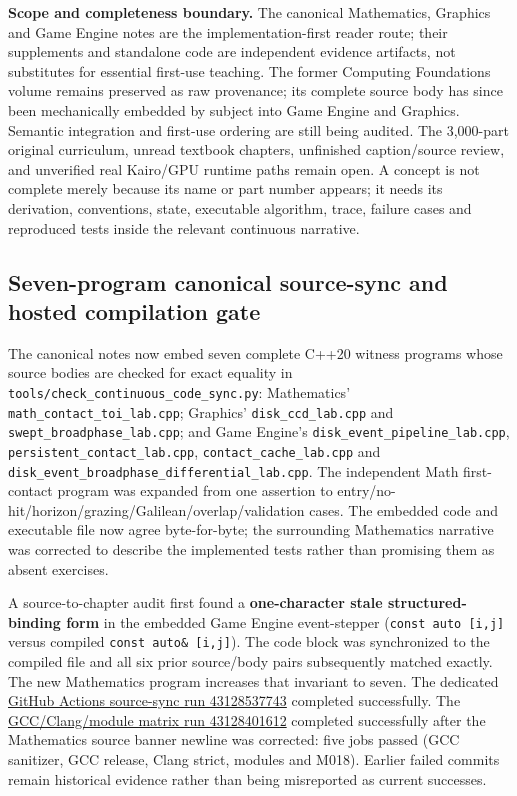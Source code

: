 \textbf{Scope and completeness boundary.} The canonical Mathematics, Graphics and Game Engine notes are the implementation-first reader route; their supplements and standalone code are independent evidence artifacts, not substitutes for essential first-use teaching. The former Computing Foundations volume remains preserved as raw provenance; its complete source body has since been mechanically embedded by subject into Game Engine and Graphics. Semantic integration and first-use ordering are still being audited. The 3,000-part original curriculum, unread textbook chapters, unfinished caption/source review, and unverified real Kairo/GPU runtime paths remain open. A concept is not complete merely because its name or part number appears; it needs its derivation, conventions, state, executable algorithm, trace, failure cases and reproduced tests inside the relevant continuous narrative.

\subsection{Seven-program canonical source-sync and hosted compilation gate}\label{appendix-3b67654799a2-seven-program-canonical-source-sync-and-hosted-compilation-gate}

The canonical notes now embed seven complete C++20 witness programs whose source bodies are checked for exact equality in \texttt{tools/check\_continuous\_code\_sync.py}: Mathematics' \texttt{math\_contact\_toi\_lab.cpp}; Graphics' \texttt{disk\_ccd\_lab.cpp} and \texttt{swept\_broadphase\_lab.cpp}; and Game Engine's \texttt{disk\_event\_pipeline\_lab.cpp}, \texttt{persistent\_contact\_lab.cpp}, \texttt{contact\_cache\_lab.cpp} and \texttt{disk\_event\_broadphase\_differential\_lab.cpp}. The independent Math first-contact program was expanded from one assertion to entry/no-hit/horizon/grazing/Galilean/overlap/validation cases. The embedded code and executable file now agree byte-for-byte; the surrounding Mathematics narrative was corrected to describe the implemented tests rather than promising them as absent exercises.

A source-to-chapter audit first found a \textbf{one-character stale structured-binding form} in the embedded Game Engine event-stepper (\texttt{const\ auto\ {[}i,j{]}} versus compiled \texttt{const\ auto\&\ {[}i,j{]}}). The code block was synchronized to the compiled file and all six prior source/body pairs subsequently matched exactly. The new Mathematics program increases that invariant to seven. The dedicated \href{https://github.com/swayam8624/Project_008_AllMight/actions/runs/43128537743}{GitHub Actions source-sync run 43128537743} completed successfully. The \href{https://github.com/swayam8624/Project_008_AllMight/actions/runs/43128401612}{GCC/Clang/module matrix run 43128401612} completed successfully after the Mathematics source banner newline was corrected: five jobs passed (GCC sanitizer, GCC release, Clang strict, modules and M018). Earlier failed commits remain historical evidence rather than being misreported as current successes.

